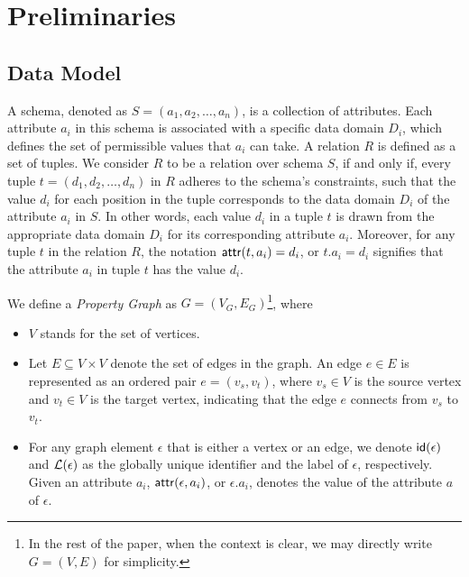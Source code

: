 \section{Preliminaries}
\label{sec:preliminaries}

\subsection{Data Model}
\label{sec:data-model}

A schema, denoted as \(S = (a_1, a_2, \ldots, a_n)\), is a collection of attributes. Each attribute \(a_i\) in this schema is associated with a specific data domain \(D_i\), which defines the set of permissible values that \(a_i\) can take.
A relation \(R\) is defined as a set of tuples. We consider \(R\) to be a relation over schema \(S\), if and only if, every tuple \(t = (d_1, d_2, \ldots, d_n)\) in \(R\) adheres to the schema's constraints, such that the value \(d_i\) for each position in the tuple corresponds to the data domain \(D_i\) of the attribute \(a_i\) in \(S\). In other words, each value \(d_i\) in a tuple \(t\) is drawn from the appropriate data domain \(D_i\) for its corresponding attribute \(a_i\).
Moreover, for any tuple \(t\) in the relation \(R\), the notation \({\mathsf{attr}}(t, a_i) = d_i\), or \(t.a_i = d_i\) signifies that the attribute \(a_i\) in tuple \(t\) has the value \(d_i\).

We define a \emph{Property Graph} as $G = (V_G, E_G)$\footnote{In the rest of the paper, when the context is clear, we may directly write $G=(V, E)$  for simplicity. },
where
\begin{itemize}
    \item $V$ stands for the set of vertices.
    \item Let $E \subseteq V \times V$ denote the set of edges in the graph. An edge $e \in E$ is represented as an ordered pair $e = (v_s, v_t)$, where $v_s \in V$ is the source vertex and $v_t \in V$ is the target vertex, indicating that the edge $e$ connects from $v_s$ to $v_t$.
    \item For any graph element $\epsilon$ that is either a vertex or an edge, we denote ${\mathsf{id}}(\epsilon)$ and $\mathcal{L}(\epsilon)$ as the globally unique identifier and the label of $\epsilon$, respectively. Given an attribute $a_i$, ${\mathsf{attr}}(\epsilon, a_i)$, or $\epsilon.a_i$, denotes the value of the attribute $a$ of $\epsilon$.
\end{itemize}

